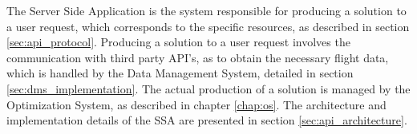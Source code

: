 The Server Side Application is the system responsible for producing a solution to a user request, which corresponds to the specific resources, as described in section \ref{sec:api_protocol}. Producing a solution to a user request involves the communication with third party API's, as to obtain the necessary flight data, which is handled by the Data Management System, detailed in section \ref{sec:dms_implementation}. The actual production of a solution is managed by the Optimization System, as described in chapter \ref{chap:os}. The architecture and implementation details of the SSA are presented in section \ref{sec:api_architecture}.


